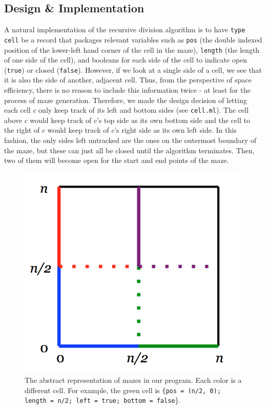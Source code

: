 \documentclass[11pt, margin=1in]{article}
\begin{document}
\subsection{Design \& Implementation}
 
A natural implementation of the recursive division algorithm is to have \texttt{type cell} be a record that packages relevant variables such as \texttt{pos} (the double indexed position of the lower-left hand corner of the cell in the maze), \texttt{length} (the length of one side of the cell), and booleans for each side of the cell to indicate open (\texttt{true}) or closed (\texttt{false}).  However, if we look at a single side of a cell, we see that it is also the side of another, adjacent cell.  Thus, from the perspective of space efficiency, there is no reason to include this information twice - at least for the process of maze generation.  Therefore, we made the design decision of letting each cell $c$ only keep track of its left and bottom sides (see \texttt{cell.ml}).  The cell above $c$ would keep track of $c$'s top side as its own bottom side and the cell to the right of $c$ would keep track of $c$'s right side as its own left side.  In this fashion, the only sides left untracked are the ones on the outermost boundary of the maze, but these can just all be closed until the algorithm terminates.  Then, two of them will become open for the start and end points of the maze. 

\begin{figure}[H]
\begin{center}
\includegraphics[scale=0.7]{structure.jpg}
\caption{The abstract representation of mazes in our program.  Each color is a different cell.  For example, the green cell is \texttt{\{pos = (n/2, 0); length = n/2; left = true; bottom = false}\}.}
\end{center}
\end{figure}
\end{document}
